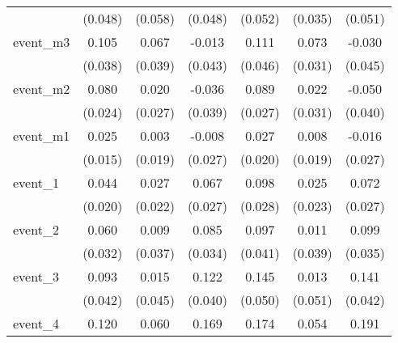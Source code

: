 {\begin{tabular}{l*{6}{c}}
            &     (0.048)         &     (0.058)         &     (0.048)         &     (0.052)         &     (0.035)         &     (0.051)         \\
[1em]
event\_m3    &       0.105\sym{**} &       0.067         &      -0.013         &       0.111\sym{*}  &       0.073\sym{*}  &      -0.030         \\
            &     (0.038)         &     (0.039)         &     (0.043)         &     (0.046)         &     (0.031)         &     (0.045)         \\
[1em]
event\_m2    &       0.080\sym{***}&       0.020         &      -0.036         &       0.089\sym{***}&       0.022         &      -0.050         \\
            &     (0.024)         &     (0.027)         &     (0.039)         &     (0.027)         &     (0.031)         &     (0.040)         \\
[1em]
event\_m1    &       0.025         &       0.003         &      -0.008         &       0.027         &       0.008         &      -0.016         \\
            &     (0.015)         &     (0.019)         &     (0.027)         &     (0.020)         &     (0.019)         &     (0.027)         \\
[1em]
event\_1     &       0.044\sym{*}  &       0.027         &       0.067\sym{*}  &       0.098\sym{***}&       0.025         &       0.072\sym{**} \\
            &     (0.020)         &     (0.022)         &     (0.027)         &     (0.028)         &     (0.023)         &     (0.027)         \\
[1em]
event\_2     &       0.060         &       0.009         &       0.085\sym{*}  &       0.097\sym{*}  &       0.011         &       0.099\sym{**} \\
            &     (0.032)         &     (0.037)         &     (0.034)         &     (0.041)         &     (0.039)         &     (0.035)         \\
[1em]
event\_3     &       0.093\sym{*}  &       0.015         &       0.122\sym{**} &       0.145\sym{**} &       0.013         &       0.141\sym{***}\\
            &     (0.042)         &     (0.045)         &     (0.040)         &     (0.050)         &     (0.051)         &     (0.042)         \\
[1em]
event\_4     &       0.120\sym{*}  &       0.060         &       0.169\sym{**} &       0.174\sym{***}&       0.054         &       0.191\sym{***}\\

\end{tabular}}
